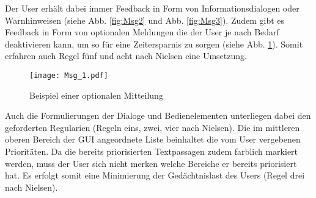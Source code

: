 Der User erh{\"a}lt dabei immer Feedback in Form von
Informationsdialogen oder Warnhinweisen (siehe Abb. \ref{fig:Msg2} und Abb.
\ref{fig:Msg3}). Zudem gibt es Feedback in Form von optionalen Meldungen die der
User je nach Bedarf deaktivieren kann, um so f{\"u}r eine Zeitersparnis zu
sorgen (siehe Abb. \ref{fig:Msg1}). Somit erfahren auch Regel f{\"u}nf und acht
nach Nielsen eine Umsetzung.

\begin{figure}[H]
\centering
\texttt{[image: Msg\_1.pdf]}
\caption{Beispiel einer optionalen Mitteilung}
\label{fig:Msg1}
\end{figure}

Auch die Formulierungen der Dialoge und Bedienelementen unterliegen dabei den
geforderten Regularien (Regeln eins, zwei, vier nach Nielsen). Die im mittleren
oberen Bereich der GUI angeordnete Liste beinhaltet die vom User vergebenen
Priorit{\"a}ten. Da die bereits priorisierten Textpassagen zudem farblich
markiert werden, muss der User sich nicht merken welche Bereiche er bereits priorisiert
hat. Es erfolgt somit eine Minimierung der Ged{\"a}chtnislast des Users
(Regel drei nach Nielsen).

